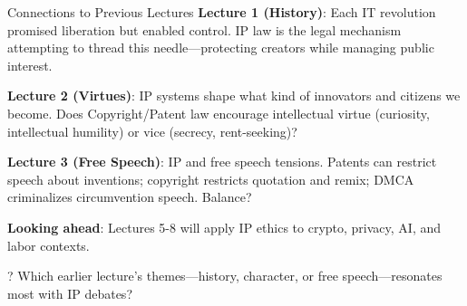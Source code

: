\documentclass[aspectratio=169]{beamer}
\begin{document}
\begin{frame}{Connections to Previous Lectures}
\textbf{Lecture 1 (History)}: Each IT revolution promised liberation but enabled control. IP law is the legal mechanism attempting to thread this needle---protecting creators while managing public interest.

\vspace{0.2cm}
\textbf{Lecture 2 (Virtues)}: IP systems shape what kind of innovators and citizens we become. Does Copyright/Patent law encourage intellectual virtue (curiosity, intellectual humility) or vice (secrecy, rent-seeking)?

\vspace{0.2cm}
\textbf{Lecture 3 (Free Speech)}: IP and free speech tensions. Patents can restrict speech about inventions; copyright restricts quotation and remix; DMCA criminalizes circumvention speech. Balance?

\vspace{0.2cm}
\textbf{Looking ahead}: Lectures 5-8 will apply IP ethics to crypto, privacy, AI, and labor contexts.

\begin{alertblock}{?}
Which earlier lecture's themes---history, character, or free speech---resonates most with IP debates?
\end{alertblock}
\end{frame}
\end{document}
